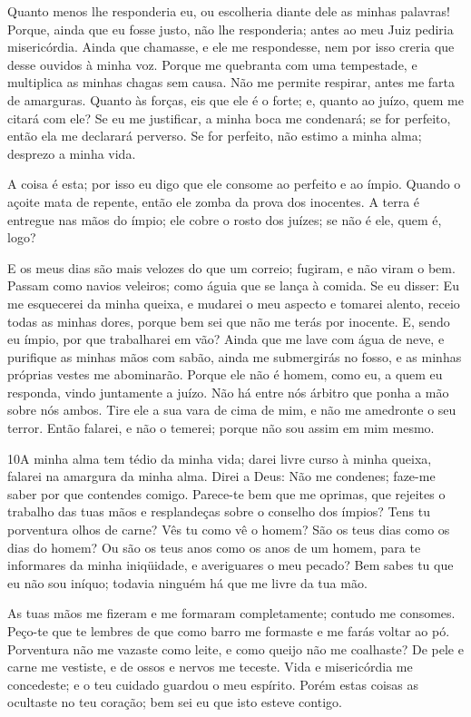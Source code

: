 Quanto menos lhe responderia eu, ou escolheria diante dele as
minhas palavras! Porque, ainda que eu fosse justo, não lhe
responderia; antes ao meu Juiz pediria misericórdia. Ainda
que chamasse, e ele me respondesse, nem por isso creria que desse
ouvidos à minha voz. Porque me quebranta com uma tempestade,
e multiplica as minhas chagas sem causa. Não me permite
respirar, antes me farta de amarguras. Quanto às forças, eis
que ele é o forte; e, quanto ao juízo, quem me citará com ele?
Se eu me justificar, a minha boca me condenará; se for
perfeito, então ela me declarará perverso. Se for perfeito,
não estimo a minha alma; desprezo a minha vida.

A coisa é esta; por isso eu digo que ele consome ao perfeito e ao
ímpio. Quando o açoite mata de repente, então ele zomba da
prova dos inocentes. A terra é entregue nas mãos do ímpio;
ele cobre o rosto dos juízes; se não é ele, quem é, logo?

E os meus dias são mais velozes do que um correio; fugiram, e não
viram o bem. Passam como navios veleiros; como águia que se
lança à comida. Se eu disser: Eu me esquecerei da minha
queixa, e mudarei o meu aspecto e tomarei alento, receio
todas as minhas dores, porque bem sei que não me terás por inocente.
E, sendo eu ímpio, por que trabalharei em vão? Ainda
que me lave com água de neve, e purifique as minhas mãos com sabão,
ainda me submergirás no fosso, e as minhas próprias vestes me
abominarão. Porque ele não é homem, como eu, a quem eu
responda, vindo juntamente a juízo. Não há entre nós árbitro
que ponha a mão sobre nós ambos. Tire ele a sua vara de cima
de mim, e não me amedronte o seu terror. Então falarei, e não
o temerei; porque não sou assim em mim mesmo.

\medskip

\lettrine{10} A minha alma tem tédio da minha vida; darei
livre curso à minha queixa, falarei na amargura da minha alma.
Direi a Deus: Não me condenes; faze-me saber por que contendes
comigo. Parece-te bem que me oprimas, que rejeites o trabalho
das tuas mãos e resplandeças sobre o conselho dos ímpios? Tens
tu porventura olhos de carne? Vês tu como vê o homem? São os
teus dias como os dias do homem? Ou são os teus anos como os anos de
um homem, para te informares da minha iniqüidade, e averiguares
o meu pecado? Bem sabes tu que eu não sou iníquo; todavia
ninguém há que me livre da tua mão.

As tuas mãos me fizeram e me formaram completamente; contudo me
consomes. Peço-te que te lembres de que como barro me formaste e
me farás voltar ao pó. Porventura não me vazaste como leite,
e como queijo não me coalhaste? De pele e carne me vestiste,
e de ossos e nervos me teceste. Vida e misericórdia me
concedeste; e o teu cuidado guardou o meu espírito. Porém
estas coisas as ocultaste no teu coração; bem sei eu que isto esteve
contigo.

